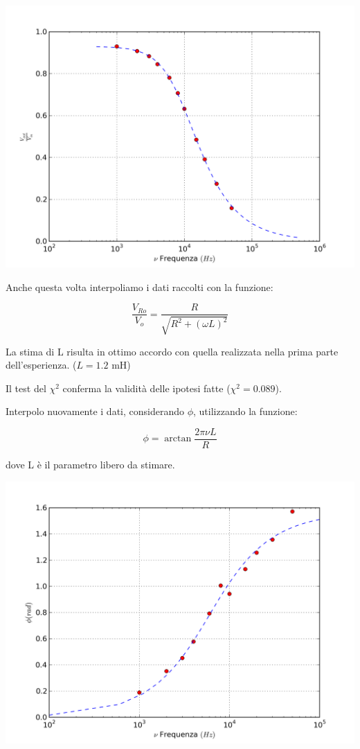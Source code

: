 \begin{center}
 \includegraphics[scale=0.70]{grafici/C3/ddpindu.png}
\end{center}

Anche questa volta interpoliamo i dati raccolti con la funzione:

$$\frac{V_{Ro}}{V_o} = \frac{R}{\sqrt{R^2+(\omega L)^2}}$$

La stima di L risulta in ottimo accordo con quella realizzata nella prima parte dell'esperienza.
($L=1.2$ mH)

Il test del $\chi^2$ conferma la validità delle ipotesi fatte ($\chi^2 = 0.089$).

Interpolo nuovamente i dati, considerando $\phi$, utilizzando la funzione:

$$ \phi = \arctan \frac{2\pi\nu L}{R} $$

dove L è il parametro libero da stimare.


\begin{center}
 \includegraphics[scale=0.70]{grafici/C3/faseindu.png}
\end{center}

